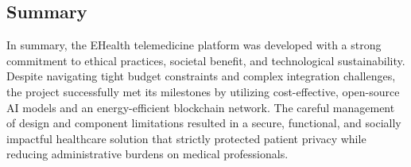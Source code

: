 \vspace{5mm}

\subsection*{Summary}
In summary, the EHealth telemedicine platform was developed with a strong commitment to ethical practices, societal benefit, and technological sustainability. Despite navigating tight budget constraints and complex integration challenges, the project successfully met its milestones by utilizing cost-effective, open-source AI models and an energy-efficient blockchain network. The careful management of design and component limitations resulted in a secure, functional, and socially impactful healthcare solution that strictly protected patient privacy while reducing administrative burdens on medical professionals.